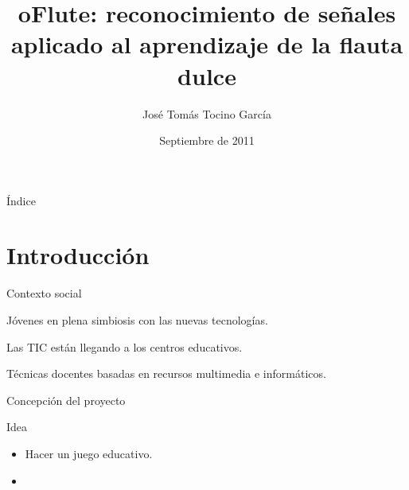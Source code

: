 \documentclass[9pt,xcolor=svgnames]{beamer}
\title{oFlute: reconocimiento de señales aplicado al aprendizaje de la flauta
  dulce}
\author{José Tomás Tocino García}
\institute[Universidad de Cádiz]{Universidad de Cádiz}
\date[Sept 2011]{Septiembre de 2011}
\begin{document}
{
\begin{frame}
  \titlepage
\end{frame}
}
\normalsize


\begin{frame}{Índice}
 \tableofcontents
\end{frame}
  

\section{Introducción}

\begin{frame}{Contexto social}
  \begin{center}
    \LARGE

    Jóvenes en plena simbiosis con las nuevas tecnologías.

    \bigskip
    \pause
    \bigskip

    Las TIC están llegando a los centros educativos.

    \bigskip
    \pause
    \bigskip

    Técnicas docentes basadas en recursos multimedia e informáticos.

  \end{center}
\end{frame}

\begin{frame}{Concepción del proyecto}
  \begin{block}{Idea}
    \begin{itemize}
    \item Hacer un juego educativo.
    \item 
    \end{itemize}
  \end{block}
  \begin{center}
    \LARGE
  \end{center}  
\end{frame}

\end{document}
